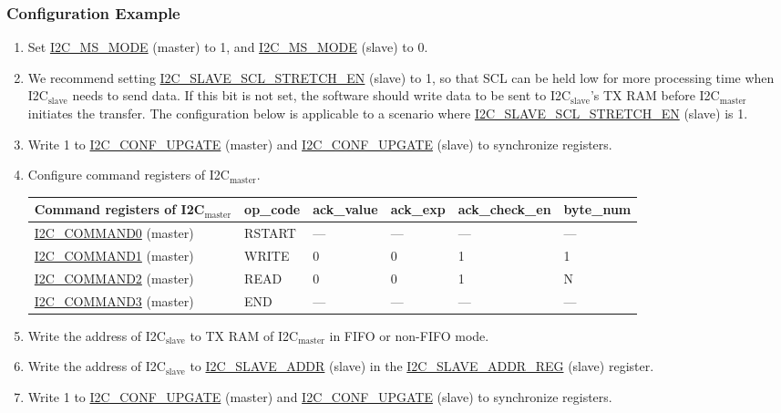 \documentclass[main\_\_EN.tex]{subfiles}
\begin{document}
\subsubsection{Configuration Example}
\begin{enumerate}
\item Set \hyperref[fielddesc:I2CMSMODE]{I2C\_MS\_MODE} (master) to 1, and \hyperref[fielddesc:I2CMSMODE]{I2C\_MS\_MODE} (slave) to 0.
\item We recommend setting \hyperref[fielddesc:I2CSLAVESCLSTRETCHEN]{I2C\_SLAVE\_SCL\_STRETCH\_EN} (slave) to 1, so that SCL can be held low for more processing time when I2C$_\text{slave}$ needs to send data. If this bit is not set, the software should write data to be sent to I2C$_\text{slave}$'s TX RAM before I2C$_\text{master}$ initiates the transfer. The configuration below is applicable to a scenario where \hyperref[fielddesc:I2CSLAVESCLSTRETCHEN]{I2C\_SLAVE\_SCL\_STRETCH\_EN} (slave) is 1. 
\item Write 1 to \hyperref[fielddesc:I2CCONFUPGATE]{I2C\_CONF\_UPGATE} (master) and \hyperref[fielddesc:I2CCONFUPGATE]{I2C\_CONF\_UPGATE} (slave) to synchronize registers.
\item Configure command registers of I2C$_\text{master}$.
\begin{longtable}{ | p{5cm} | p{1.5cm} | p{1.5cm} | p{1.5cm} |p{2.5cm} | p{1.5cm}|}
\hline\rowcolor{lightgray}
Command registers of I2C$_\text{master}$& op\_code & ack\_value&ack\_exp&ack\_check\_en&byte\_num  \\ \hline
\hyperref[fielddesc:I2CCOMMAND0]{I2C\_COMMAND0} (master)& RSTART& ---&---&---&---  \\ \hline
\hyperref[fielddesc:I2CCOMMAND1]{I2C\_COMMAND1} (master)& WRITE& 0&0&1&1  \\ \hline
\hyperref[fielddesc:I2CCOMMAND2]{I2C\_COMMAND2} (master)& READ& 0&0&1&N  \\ \hline
\hyperref[fielddesc:I2CCOMMAND3]{I2C\_COMMAND3} (master)& END& ---&---&---&---  \\ \hline
\end{longtable}
\item Write the address of I2C$_\text{slave}$ to TX RAM of I2C$_\text{master}$ in FIFO or non-FIFO mode.
\item Write the address of I2C$_\text{slave}$ to \hyperref[fielddesc:I2CSLAVEADDR]{I2C\_SLAVE\_ADDR} (slave) in the \hyperref[regdesc:I2CSLAVEADDRREG]{I2C\_SLAVE\_ADDR\_REG} (slave) register.
\item Write 1 to \hyperref[fielddesc:I2CCONFUPGATE]{I2C\_CONF\_UPGATE} (master) and \hyperref[fielddesc:I2CCONFUPGATE]{I2C\_CONF\_UPGATE} (slave) to synchronize registers.

\end{enumerate}
\end{document}
